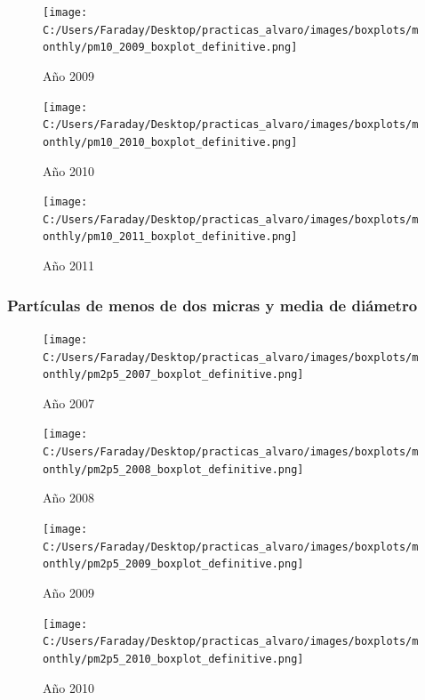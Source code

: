 \documentclass[12pt]{article}
\begin{document}
\newpage

\begin{figure}[H]
\texttt{[image: C:/Users/Faraday/Desktop/practicas\_alvaro/images/boxplots/monthly/pm10\_2009\_boxplot\_definitive.png]}
\caption{Año 2009}
\label{fig:box-ann-3-2009}
\end{figure}

\begin{figure}[H]
\texttt{[image: C:/Users/Faraday/Desktop/practicas\_alvaro/images/boxplots/monthly/pm10\_2010\_boxplot\_definitive.png]}
\caption{Año 2010}
\label{fig:box-ann-3-2010}
\end{figure}

\newpage

\begin{figure}[H]
\texttt{[image: C:/Users/Faraday/Desktop/practicas\_alvaro/images/boxplots/monthly/pm10\_2011\_boxplot\_definitive.png]}
\caption{Año 2011}
\label{fig:box-ann-3-2011}
\end{figure}

\newpage

\subsubsection*{Partículas de menos de dos micras y media de diámetro}
%

\begin{figure}[H]
\texttt{[image: C:/Users/Faraday/Desktop/practicas\_alvaro/images/boxplots/monthly/pm2p5\_2007\_boxplot\_definitive.png]}
\caption{Año 2007}
\label{fig:box-ann-4-2007}
\end{figure}

\begin{figure}[H]
\texttt{[image: C:/Users/Faraday/Desktop/practicas\_alvaro/images/boxplots/monthly/pm2p5\_2008\_boxplot\_definitive.png]}
\caption{Año 2008}
\label{fig:box-ann-4-2008}
\end{figure}

\newpage

\begin{figure}[H]
\texttt{[image: C:/Users/Faraday/Desktop/practicas\_alvaro/images/boxplots/monthly/pm2p5\_2009\_boxplot\_definitive.png]}
\caption{Año 2009}
\label{fig:box-ann-4-2009}
\end{figure}

\begin{figure}[H]
\texttt{[image: C:/Users/Faraday/Desktop/practicas\_alvaro/images/boxplots/monthly/pm2p5\_2010\_boxplot\_definitive.png]}
\caption{Año 2010}
\label{fig:box-ann-4-2010}
\end{figure}
\end{document}
